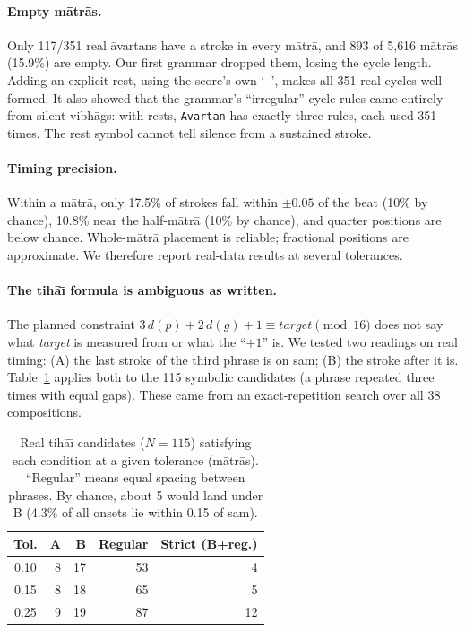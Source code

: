 \documentclass[11pt]{article}
\newcommand{\matra}{m\=atr\=a}
\newcommand{\avartan}{\=avartan}
\newcommand{\vibhag}{vibh\=ag}
\newcommand{\tihai}{tih\=a\={\i}}
\begin{document}
\paragraph{Empty \matra{}s.} Only 117/351 real \avartan{}s have a stroke in
every \matra{}, and 893 of 5{,}616 \matra{}s (15.9\%) are empty. Our first
grammar dropped them, losing the cycle length. Adding an explicit rest, using
the score's own `\texttt{-}', makes all 351 real cycles well-formed. It also
showed that the grammar's ``irregular'' cycle rules came entirely from silent
\vibhag{}s: with rests, \texttt{Avartan} has exactly three rules, each used 351
times. The rest symbol cannot tell silence from a sustained stroke.

\paragraph{Timing precision.} Within a \matra{}, only 17.5\% of strokes fall
within $\pm0.05$ of the beat (10\% by chance), 10.8\% near the half-\matra{}
(10\% by chance), and quarter positions are below chance. Whole-\matra{}
placement is reliable; fractional positions are approximate. We therefore
report real-data results at several tolerances.

\paragraph{The \tihai{} formula is ambiguous as written.} The planned
constraint $3\,d(p)+2\,d(g)+1 \equiv \textit{target} \pmod{16}$ does not say
what \textit{target} is measured from or what the ``$+1$'' is. We tested two
readings on real timing: (A) the last stroke of the third phrase is on sam;
(B) the stroke after it is. Table~\ref{tab:tihai} applies both to the 115
symbolic candidates (a phrase repeated three times with equal gaps). These
came from an exact-repetition search over all 38 compositions.

\begin{table}[t]
\centering\small
\begin{tabular}{crrrr}
\toprule
Tol. & A & B & Regular & Strict (B+reg.) \\
\midrule
0.10 & 8 & 17 & 53 & 4 \\
0.15 & 8 & 18 & 65 & 5 \\
0.25 & 9 & 19 & 87 & 12 \\
\bottomrule
\end{tabular}
\caption{Real \tihai{} candidates ($N{=}115$) satisfying each condition at a
given tolerance (\matra{}s). ``Regular'' means equal spacing between
phrases. By chance, about 5 would land under B (4.3\% of all onsets lie
within 0.15 of sam).}
\label{tab:tihai}
\end{table}
\end{document}
